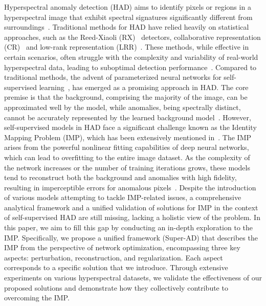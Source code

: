 Hyperspectral anomaly detection (HAD) aims to identify pixels or regions in a hyperspectral image that exhibit spectral signatures significantly different from surroundings~\cite{9205919,su2021hyperspectral,bioucas2013hyperspectral}. Traditional methods for HAD have relied heavily on statistical approaches, such as the Reed-Xiaoli (RX)~\cite{RXD,1386510} detectors, collaborative representation (CR)~\cite{CRD,8561244} and low-rank representation (LRR)~\cite{7322257,liu2010robust}. These methods, while effective in certain scenarios, often struggle with the complexity and variability of real-world hyperspectral data, leading to suboptimal detection performance~\cite{7322257}. Compared to traditional methods, the advent of parameterized neural networks for self-supervised learning~\cite{AutoAD,PDBSNet,BiGSeT,BockNet,SMCNet,DirectNet,wu2024transformer}, has emerged as a promising approach in HAD. The core premise is that the background, comprising the majority of the image, can be approximated well by the model, while anomalies, being spectrally distinct, cannot be accurately represented by the learned background model~\cite{7322257,BS3LNet}. However, self-supervised models in HAD face a significant challenge known as the Identity Mapping Problem (IMP), which has been extensively mentioned in~\cite{DirectNet,BiGSeT,PDBSNet,BockNet,BS3LNet, rs16163036}. The IMP arises from the powerful nonlinear fitting capabilities of deep neural networks, which can lead to overfitting to the entire image dataset. As the complexity of the network increases or the number of training iterations grows, these models tend to reconstruct both the background and anomalies with high fidelity, resulting in imperceptible errors for anomalous pixels~\cite{9715082}. Despite the introduction of various models attempting to tackle IMP-related issues, a comprehensive analytical framework and a unified validation of solutions for IMP in the context of self-supervised HAD are still missing, lacking a holistic view of the problem. In this paper, we aim to fill this gap by conducting an in-depth exploration to the IMP. Specifically, we propose a unified framework (Super-AD) that describes the IMP from the perspective of network optimization, encompassing three key aspects: perturbation, reconstruction, and regularization. Each aspect corresponds to a specific solution that we introduce. Through extensive experiments on various hyperspectral datasets, we validate the effectiveness of our proposed solutions and demonstrate how they collectively contribute to overcoming the IMP.



